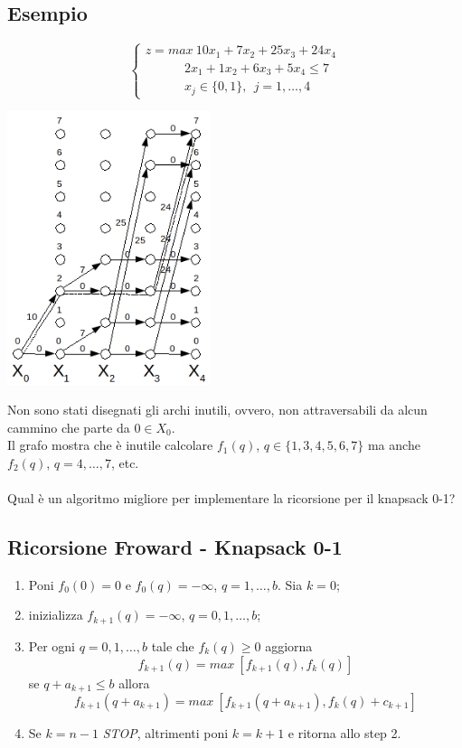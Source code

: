 \subsection{Esempio}
\begin{equation*}
	\begin{cases}
		z=max\ 10x_{1}+7x_{2}+25x_{3}+24x_{4} \\
		\ \ \ \ \ \ \ \ \ \ \ \ \ \ 2x_{1}+1x_{2}+6x_{3}+5x_{4}\le 7 \\
		\ \ \ \ \ \ \ \ \ \ \ \ \ \ x_{j}\in\{0,1\},\ \ j=1,\dots,4
	\end{cases}
\end{equation*}
\centerline{\includegraphics[height=8cm]{images/graph40.png}}
Non sono stati disegnati gli archi inutili, ovvero, non attraversabili da alcun cammino che parte da $0\in X_{0}$.\\
Il grafo mostra che è inutile calcolare $f_{1}(q)$, $q\in\{1,3,4,5,6,7\}$ ma anche $f_{2}(q)$, $q=4,\dots,7$, etc.\\\\
Qual è un algoritmo migliore per implementare la ricorsione per il knapsack 0-1?

\subsection{Ricorsione Froward - Knapsack 0-1}
\begin{enumerate}
	\item Poni $f_{0}(0)=0$ e $f_{0}(q)=-\infty$, $q=1,\dots,b$. Sia $k=0$;
	\item inizializza $f_{k+1}(q)=-\infty$, $q=0,1,\dots,b$;
	\item Per ogni $q=0,1,\dots,b$ tale che $f_{k}(q)\ge 0$ aggiorna 
	\begin{equation*}
		f_{k+1}(q)=max\ [f_{k+1}(q),f_{k}(q)] 
	\end{equation*}
	se $q+a_{k+1}\le b$ allora
	\begin{equation*}
		f_{k+1}(q+a_{k+1})=max\ [f_{k+1}(q+a_{k+1}),f_{k}(q)+c_{k+1}]
	\end{equation*}
	\item Se $k=n-1$ \textit{STOP}, altrimenti poni $k=k+1$ e ritorna allo step 2.
\end{enumerate}

